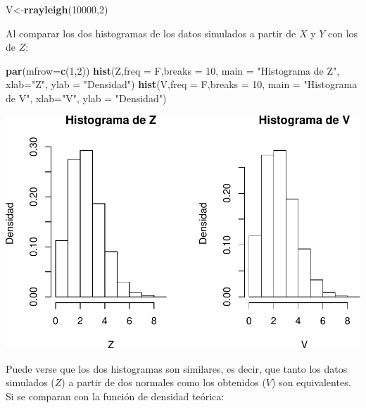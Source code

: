 \documentclass[]{article}
\newenvironment{Shaded}{\begin{snugshade}}{\end{snugshade}}
\newcommand{\KeywordTok}[1]{\textcolor[rgb]{0.13,0.29,0.53}{\textbf{#1}}}
\newcommand{\DataTypeTok}[1]{\textcolor[rgb]{0.13,0.29,0.53}{#1}}
\newcommand{\DecValTok}[1]{\textcolor[rgb]{0.00,0.00,0.81}{#1}}
\newcommand{\StringTok}[1]{\textcolor[rgb]{0.31,0.60,0.02}{#1}}
\newcommand{\NormalTok}[1]{#1}
\begin{document}
\begin{Shaded}
\begin{Highlighting}[]
\NormalTok{V<-}\KeywordTok{rrayleigh}\NormalTok{(}\DecValTok{10000}\NormalTok{,}\DecValTok{2}\NormalTok{)}
\end{Highlighting}
\end{Shaded}

Al comparar los dos histogramas de los datos simulados a partir de \(X\)
y \(Y\) con los de \(Z\):

\begin{Shaded}
\begin{Highlighting}[]
\KeywordTok{par}\NormalTok{(}\DataTypeTok{mfrow=}\KeywordTok{c}\NormalTok{(}\DecValTok{1}\NormalTok{,}\DecValTok{2}\NormalTok{))}
\KeywordTok{hist}\NormalTok{(Z,}\DataTypeTok{freq =}\NormalTok{ F,}\DataTypeTok{breaks =} \DecValTok{10}\NormalTok{, }\DataTypeTok{main =} \StringTok{"Histograma de Z"}\NormalTok{, }\DataTypeTok{xlab=}\StringTok{"Z"}\NormalTok{, }\DataTypeTok{ylab =} \StringTok{"Densidad"}\NormalTok{)}
\KeywordTok{hist}\NormalTok{(V,}\DataTypeTok{freq =}\NormalTok{ F,}\DataTypeTok{breaks =} \DecValTok{10}\NormalTok{, }\DataTypeTok{main =} \StringTok{"Histograma de V"}\NormalTok{, }\DataTypeTok{xlab=}\StringTok{"V"}\NormalTok{, }\DataTypeTok{ylab =} \StringTok{"Densidad"}\NormalTok{)}
\end{Highlighting}
\end{Shaded}

\includegraphics{notebook_simulaciones_files/figure-latex/unnamed-chunk-4-1.pdf}

Puede verse que los dos histogramas son similares, es decir, que tanto
los datos simulados (\(Z\)) a partir de dos normales como los obtenidos
(\(V\)) son equivalentes. Si se comparan con la función de densidad
teórica:
\end{document}
